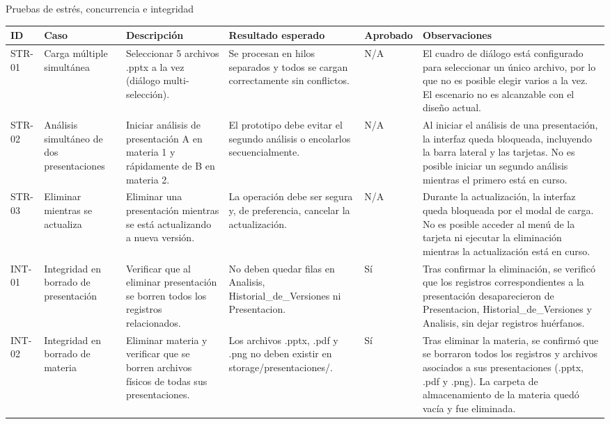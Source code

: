 \documentclass[11pt]{article}
\begin{document}
Pruebas de estrés, concurrencia e integridad
{\tiny
\begin{longtable}{@{}|L{1.5cm}|L{3cm}|L{3.5cm}|L{3.5cm}|L{1.5cm}|L{1.7cm}|@{}}
\hline
\textbf{ID} & \textbf{Caso} & \textbf{Descripción} & \textbf{Resultado esperado} & \textbf{Aprobado} & \textbf{Observaciones} \\ \hline
\endhead
STR-01 & Carga múltiple simultánea & Seleccionar 5 archivos .pptx a la vez (diálogo multi-selección). & Se procesan en hilos separados y todos se cargan correctamente sin conflictos. & N/A & El cuadro de diálogo está configurado para seleccionar un único archivo, por lo que no es posible elegir varios a la vez. El escenario no es alcanzable con el diseño actual. \\ \hline
STR-02 & Análisis simultáneo de dos presentaciones & Iniciar análisis de presentación A en materia 1 y rápidamente de B en materia 2. & El prototipo debe evitar el segundo análisis o encolarlos secuencialmente. & N/A & Al iniciar el análisis de una presentación, la interfaz queda bloqueada, incluyendo la barra lateral y las tarjetas. No es posible iniciar un segundo análisis mientras el primero está en curso. \\ \hline
STR-03 & Eliminar mientras se actualiza & Eliminar una presentación mientras se está actualizando a nueva versión. & La operación debe ser segura y, de preferencia, cancelar la actualización. & N/A & Durante la actualización, la interfaz queda bloqueada por el modal de carga. No es posible acceder al menú de la tarjeta ni ejecutar la eliminación mientras la actualización está en curso. \\ \hline
INT-01 & Integridad en borrado de presentación & Verificar que al eliminar presentación se borren todos los registros relacionados. & No deben quedar filas en Analisis, Historial\_\allowbreak{}de\_Versiones ni Presentacion. & Sí & Tras confirmar la eliminación, se verificó que los registros correspondientes a la presentación desaparecieron de Presentacion, Historial\_\allowbreak{}de\_Versiones y Analisis, sin dejar registros huérfanos. \\ \hline
INT-02 & Integridad en borrado de materia & Eliminar materia y verificar que se borren archivos físicos de todas sus presentaciones. & Los archivos .pptx, .pdf y .png no deben existir en storage/presentaciones/. & Sí & Tras eliminar la materia, se confirmó que se borraron todos los registros y archivos asociados a sus presentaciones (.pptx, .pdf y .png). La carpeta de almacenamiento de la materia quedó vacía y fue eliminada. \\ \hline

\end{longtable}}
\end{document}
